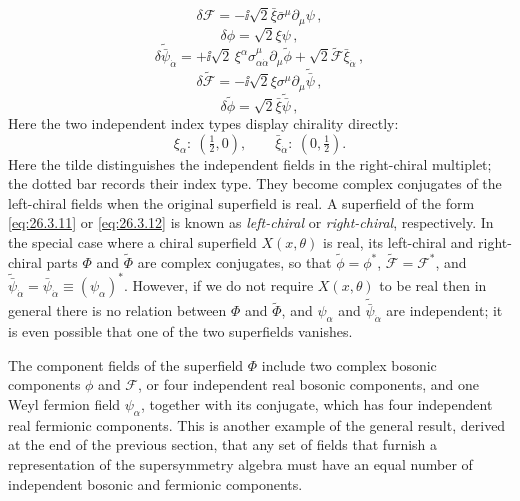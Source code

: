 \begin{equation}
  \delta\mathcal{F}
  =-\ii\sqrt{2}\bar\xi\bar\sigma^\mu\partial_\mu\psi\,,
  \tag{26.3.16}\label{eq:26.3.16}
\end{equation}
\begin{equation}
  \delta\phi=\sqrt{2}\xi\psi\,,
  \tag{26.3.17}\label{eq:26.3.17}
\end{equation}
\begin{equation}
  \delta\widetilde{\bar\psi}_{\dot\alpha}
  =+\ii\sqrt{2}\,\xi^\alpha\sigma^\mu_{\alpha\dot\alpha}
    \partial_\mu\widetilde{\phi}
  +\sqrt{2}\widetilde{\mathcal{F}}\bar\xi_{\dot\alpha}\,,
  \tag{26.3.18}\label{eq:26.3.18}
\end{equation}
\begin{equation}
  \delta\widetilde{\mathcal{F}}
  =-\ii\sqrt{2}\xi\sigma^\mu
    \partial_\mu\widetilde{\bar\psi}\,,
  \tag{26.3.19}\label{eq:26.3.19}
\end{equation}
\begin{equation}
  \delta\widetilde{\phi}
  =\sqrt{2}\bar\xi\widetilde{\bar\psi}\,,
  \tag{26.3.20}\label{eq:26.3.20}
\end{equation}
Here the two independent index types display chirality directly:
\[
  \xi_\alpha:\ (\tfrac12,0),
  \qquad
  \bar\xi_{\dot\alpha}:\ (0,\tfrac12).
\]
Here the tilde distinguishes the independent fields in the right-chiral
multiplet; the dotted bar records their index type.  They become complex
conjugates of the left-chiral fields when the original superfield is real.
A superfield of the form \eqref{eq:26.3.11} or
\eqref{eq:26.3.12} is known as \emph{left-chiral} or \emph{right-chiral},
respectively. In the special case where a chiral superfield $X(x,\theta)$ is
real, its left-chiral and right-chiral parts $\Phi$ and $\widetilde{\Phi}$ are
complex conjugates, so that $\widetilde{\phi}=\phi^*$,
$\widetilde{\mathcal{F}}=\mathcal{F}^*$, and
\(\widetilde{\bar\psi}_{\dot\alpha}
=\bar\psi_{\dot\alpha}\equiv(\psi_\alpha)^*\).
However, if we do not require $X(x,\theta)$ to be real then in general there
is no relation between \(\Phi\) and \(\widetilde{\Phi}\), and
\(\psi_\alpha\) and \(\widetilde{\bar\psi}_{\dot\alpha}\) are independent;
it is even possible that one of the two superfields vanishes.

The component fields of the superfield $\Phi$ include two complex bosonic
components $\phi$ and $\mathcal{F}$, or four independent real bosonic
components, and one Weyl fermion field \(\psi_\alpha\), together with its
conjugate, which has four independent real fermionic components. This is
another example of the general result, derived
at the end of the previous section, that any set of fields that furnish a
representation of the supersymmetry algebra must have an equal number of
independent bosonic and fermionic components.

